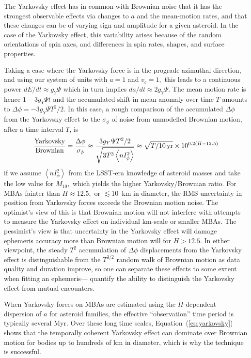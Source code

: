 \documentclass[linenumbers, onecolumn]{aastex631}
\newcommand{\eqq}[1]{Equation~(\ref{#1})}
\newcommand\edited[1]{{\color{red} {#1}}}
\newcommand{\nIphi}{\left\langle nI_\phi^2\right\rangle}
\begin{document}
 The Yarkovsky effect has in common with Brownian noise that it has the strongest observable effects via changes to $a$ and the mean-motion rates, and that these changes can be of varying sign and amplitude for a given asteroid.  In the case of the Yarkovsky effect, this variability arises because of the random orientations of spin axes, and differences in spin rates, shapes, and surface properties.  
 
Taking a case where the Yarkovsky force is in the prograde azimuthal direction, and using our system of units with $a=1$ and $v_c=1,$ this leads to a continuous power $dE/dt\approx g_Y\Psi$ which in turn implies $da/dt\approx2g_Y\Psi.$   The mean motion rate is hence $1-3 g_Y\Psi t$ and the accumulated shift in mean anomaly over time $T$ amounts to $\Delta\phi = -3 g_Y \Psi  T^2/2.$   In this case, a rough comparison of the accumulated $\Delta\phi$ from the Yarkovsky effect to the $\sigma_\phi$ of noise from unmodelled Brownian motion, after a time interval $T$, is
\edited{
\begin{equation}
\frac{\textrm{Yarkovsky}}{\textrm{Brownian}} = 
   \frac{\Delta\phi}{\sigma_\phi} \approx \frac{ 3 g_Y \Psi
     T^2/2}{\sqrt{3 T^3 \nIphi}} \approx \sqrt{T/10\,{\rm yr}} \times 10^{0.2(H-12.5)}
     \label{eq:yarkovsky}
\end{equation}
if we assume $\nIphi$ from the LSST-era knowledge of asteroid
masses and take the low value for $M_{10},$ which yields the higher Yarkovsky/Brownian ratio.}
For MBAs fainter than \edited{$H\approx12.5,$ or
  $\lesssim10$~km in diameter,} the RMS uncertainty in position from
Yarkovsky forces exceeds the Brownian motion noise.
The optimist's view of this is that Brownian
  motion will not interfere with attempts to measure the Yarkovsky
  effect on individual km-scale or smaller MBAs.  The pessimist's view is that uncertainty in
 the  Yarkovsky effect \edited{will damage ephemeris accuracy more than Brownian
  motion will for $H>12.5.$}  In either viewpoint, the steady $T^2$ accumulation of
  $\Delta\phi$ displacements from the Yarkovsky effect is
  distinguishable from the $T^{3/2}$ random walk of Brownian motion as
  data quality and duration improve, so one can separate these effects to
  some extent when fitting an ephemeris---\citet{negin} quantify the
  ability to distinguish the Yarkovsky effect from mutual encounters.

When Yarkovsky forces on MBAs are estimated using the $H$-dependent
dispersion of $a$ for asteroid families, the effective ``observation''
time period is typically several Myr.  Over these long time scales,
\eqq{eq:yarkovsky} shows that the temporally coherent Yarkovsky effect
can dominate over Brownian motion for bodies up to hundreds of km
in diameter, which is why the technique is successful.
\end{document}
